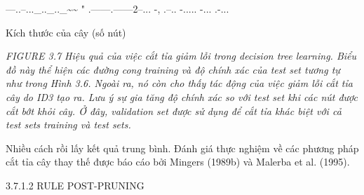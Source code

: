 ---..--...\_..\_..\_\textasciitilde{}\textasciitilde{} " .------.------2--... -, .--.. -..... -... .-...

Kích thước của cây (số nút)

\noindent\textit{FIGURE 3.7 Hiệu quả của việc cắt tỉa giảm lỗi trong decision tree learning. Biểu đồ này thể hiện các đường cong training và độ chính xác của test set tương tự như trong Hình 3.6. Ngoài ra, nó còn cho thấy tác động của việc giảm lỗi cắt tỉa cây do ID3 tạo ra. Lưu ý sự gia tăng độ chính xác so với test set khi các nút được cắt bớt khỏi cây. Ở đây, validation set được sử dụng để cắt tỉa khác biệt với cả test sets training và test sets.}

Nhiều cách rồi lấy kết quả trung bình. Đánh giá thực nghiệm về các phương pháp cắt tỉa cây thay thế được báo cáo bởi Mingers (1989b) và Malerba et al. (1995).

3.7.1.2 RULE POST-PRUNING

